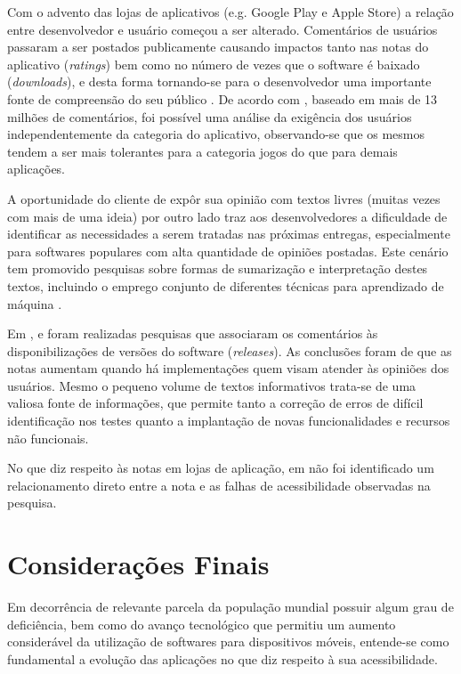 \documentclass[
	12pt,				%
	oneside,			%
	a4paper,			%
	english,			%
	brazil				%
	]{abntex2ppgsi}
\begin{document}
Com o advento das lojas de aplicativos (e.g. Google Play e Apple Store) a relação entre desenvolvedor e usuário começou a ser alterado. Comentários de usuários passaram a ser postados publicamente causando impactos tanto nas notas do aplicativo (\textit{ratings}) bem como no número de vezes que o software é baixado (\textit{downloads}), e desta forma tornando-se para o desenvolvedor uma importante fonte de compreensão do seu público \cite{Pagano2013userfeedback}. De acordo com \cite{Fu2013whypeoplehate}, baseado em mais de 13 milhões de comentários, foi possível uma análise da exigência dos usuários independentemente da categoria do aplicativo, observando-se que os mesmos tendem a ser mais tolerantes para a categoria jogos do que para demais aplicações.

A oportunidade do cliente de expôr sua opinião com textos livres (muitas vezes com mais de uma ideia\cite{Mcilroy2016analyzing}) por outro lado traz aos desenvolvedores a dificuldade de identificar as necessidades a serem tratadas nas próximas entregas, especialmente para softwares populares com alta quantidade de opiniões postadas. Este cenário tem promovido pesquisas sobre formas de sumarização \cite{Iacob2013retrieving,Iacob2014online,Fu2013whypeoplehate} e interpretação destes textos, incluindo o emprego conjunto de diferentes técnicas para aprendizado de máquina \cite{Panichella2015how}.

Em \cite{Palomba2015userreviews}, \cite{Palompa2018crowdsourcing} e \cite{Li2018MobileAE} foram realizadas pesquisas que associaram os comentários às disponibilizações de versões do software (\textit{releases}). As conclusões foram de que as notas aumentam quando há implementações quem visam atender às opiniões dos usuários. Mesmo o pequeno volume de textos informativos trata-se de uma valiosa fonte de informações, que permite tanto a correção de erros de difícil identificação nos testes quanto a implantação de novas funcionalidades e recursos não funcionais.

No que diz respeito às notas em lojas de aplicação, em \cite{Yan2019currentstatus} não foi identificado um relacionamento direto entre a nota e as falhas de acessibilidade observadas na pesquisa.


\section{Considerações Finais}
Em decorrência de relevante parcela da população mundial possuir algum grau de deficiência, bem como do avanço tecnológico que permitiu um aumento considerável da utilização de softwares para dispositivos móveis, entende-se como fundamental a evolução das aplicações no que diz respeito à sua acessibilidade.
\end{document}
